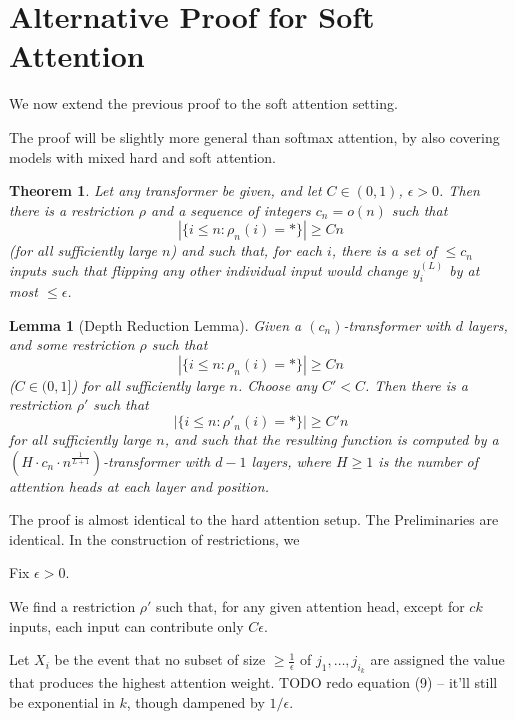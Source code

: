 \documentclass[11pt,a4paper]{article}
\newcounter{theorem}
\newtheorem{lemma}[theorem]{Lemma}
\newtheorem{thm}[theorem]{Theorem}
\begin{document}
\section{Alternative Proof for Soft Attention}\label{sec:soft-alternate}

We now extend the previous proof to the soft attention setting.

The proof will be slightly more general than softmax attention, by also covering models with mixed hard and soft attention.

\begin{thm}\label{thm:softmax-main-adapt}
Let any transformer be given, and let $C \in (0,1)$, $\epsilon > 0$.
Then there is a restriction $\rho$ and a sequence of integers $c_n = o(n)$ such that 
$$|\{i \leq n: \rho_n(i) = *\}| \geq Cn$$
(for all sufficiently large $n$) and such that, for each $i$, there is a set of $\leq c_n$ inputs such that flipping any other individual input would change $y_i^{(L)}$ by at most $\leq \epsilon$.
\end{thm}

\begin{lemma}[Depth Reduction Lemma]
Given a $(c_n)$-transformer with $d$ layers, and some restriction $\rho$ such that
\begin{equation}
|\{i \leq n: \rho_n(i) = *\}| \geq Cn
\end{equation}
($C \in (0,1]$)
for all sufficiently large $n$.
Choose any $C' < C$.
Then there is a restriction $\rho'$ 
such that
\begin{equation}
|\{i \leq n: \rho'_n(i) = *\}| \geq C'n
\end{equation}
for all sufficiently large $n$, 
and such that the resulting function is computed by a $(H\cdot c_n\cdot n^\frac{1}{L+1})$-transformer with $d-1$ layers, where $H \geq 1$ is the number of attention heads at each layer and position.
\end{lemma}

The proof is almost identical to the hard attention setup.
The Preliminaries are identical.
In the construction of restrictions, we 

Fix $\epsilon > 0$.

We find a restriction $\rho'$ such that, for any given attention head, except for $ck$ inputs, each input can contribute only $C\epsilon$.

Let $X_i$ be the event that no subset of size $\geq \frac{1}{\epsilon}$ of $j_1, \dots, j_{i_k}$ are assigned the value that produces the highest attention weight.
TODO redo equation (9) -- it'll still be exponential in $k$, though dampened by $1/\epsilon$.
\end{document}

